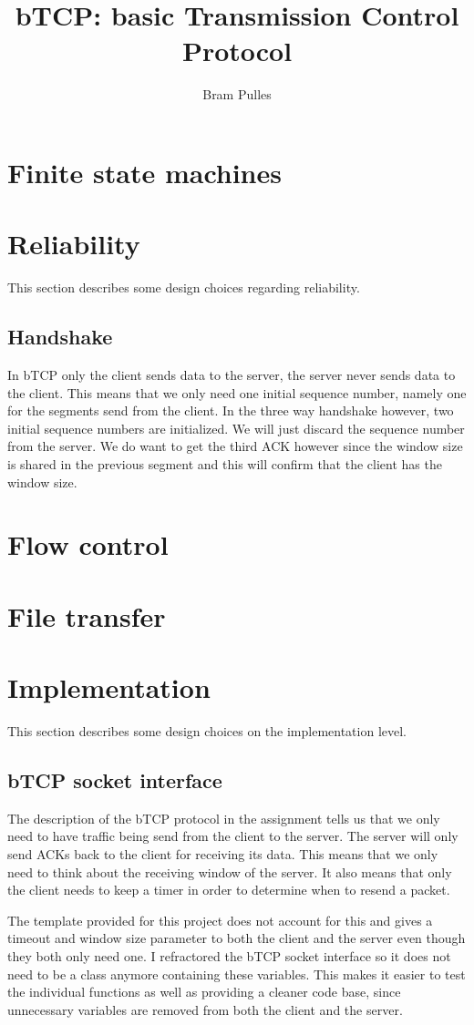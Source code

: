 \documentclass[a4paper]{article}
\author{Bram Pulles}
\title{\textbf{bTCP: basic Transmission Control Protocol}}
\begin{document}
\maketitle

\tableofcontents
\pagebreak

\section{Finite state machines}

\section{Reliability}
This section describes some design choices regarding reliability.

	\subsection{Handshake}
	In bTCP only the client sends data to the server, the server never sends data to the client. This means that we only need one initial sequence number, namely one for the segments send from the client. In the three way handshake however, two initial sequence numbers are initialized. We will just discard the sequence number from the server. We do want to get the third ACK however since the window size is shared in the previous segment and this will confirm that the client has the window size.

\section{Flow control}

\section{File transfer}

\section{Implementation}
This section describes some design choices on the implementation level.

	\subsection{bTCP socket interface}
	The description of the bTCP protocol in the assignment tells us that we only need to have traffic being send from the client to the server. The server will only send ACKs back to the client for receiving its data. This means that we only need to think about the receiving window of the server. It also means that only the client needs to keep a timer in order to determine when to resend a packet.

	The template provided for this project does not account for this and gives a timeout and window size parameter to both the client and the server even though they both only need one. I refractored the bTCP socket interface so it does not need to be a class anymore containing these variables. This makes it easier to test the individual functions as well as providing a cleaner code base, since unnecessary variables are removed from both the client and the server.
\end{document}
